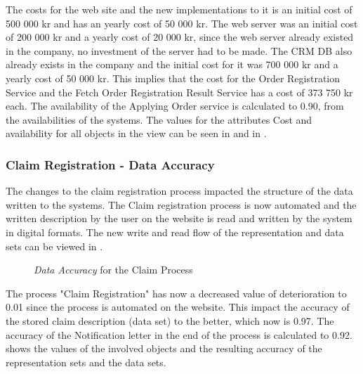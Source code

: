 The costs for the web site and the new implementations to it is an initial cost of 500 000 kr and has an yearly cost of 50 000 kr. The web server was an initial cost of 200 000 kr and a yearly cost of 20 000 kr, since the web server already existed in the company, no investment of the server had to be made. The CRM DB also already exists in the company and the initial cost for it was 700 000 kr and a yearly cost of 50 000 kr. This implies that the cost for the Order Registration Service and the Fetch Order Registration Result Service has a cost of 373 750 kr each. The availability of the Applying Order service is calculated to 0.90, from the availabilities of the systems. The values for the attributes Cost and availability for all objects in the view can be seen in  and in .



\subsubsection{Claim Registration - Data Accuracy}
The changes to the claim registration process impacted the structure of the data written to the systems. The Claim registration process is now automated and the written description by the user on the website is read and written by the system in digital formats. The new write and read flow of the representation and data sets can be viewed in . 
\label{sec:claim_analysis_to_be}
	\begin{center}
		\begin{figure}[H]
			\centering
			\setlength\fboxsep{7pt}
			\setlength\fboxrule{0.5pt}
			\caption{\textsl{Data Accuracy} for the Claim Process}
			\label{fig:map_claim_data_to_be}
		\end{figure}
	\end{center}
	The process "Claim Registration" has now a decreased value of deterioration to 0.01 since the process is automated on the website. This impact the accuracy of the stored claim description (data set) to the better, which now is 0.97. The accuracy of the Notification letter in the end of the process is calculated to 0.92.  shows the values of the involved objects and the resulting accuracy of the representation sets and the data sets.

%
